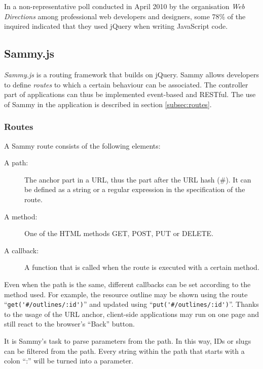 In a non-representative poll conducted in April 2010 by the organisation \textit{Web Directions} among professional web developers and designers, some 78\% of the inquired indicated that they used jQuery when writing JavaScript code. \cite{jquery:verbreitung}


\subsection{Sammy.js}
\label{subsec:sammy}

\textit{Sammy.js} \cite{sammy:homepage} is a routing framework that builds on jQuery. Sammy allows developers to define \textit{routes} to which a certain behaviour can be associated. The controller part of applications can thus be implemented event-based and RESTful. The use of Sammy in the application is described in section \ref{subsec:routes}.

\subsubsection{Routes}

A Sammy route consists of the following elements:

\begin{description}
  \item[A path:] The anchor part in a URL, thus the part after the URL hash ({\selectfont\#}). It can be defined as a string or a regular expression in the specification of the route.
  \item[A method:] One of the HTML methods {\selectfont GET}, {\selectfont POST}, {\selectfont PUT} or {\selectfont DELETE}.
  \item[A callback:] A function that is called when the route is executed with a certain method.
\end{description}

Even when the path is the same, different callbacks can be set according to the method used. For example, the resource outline may be shown using the route \enquote{\lstinline!get('#/outlines/:id')!} and updated using \enquote{\lstinline!put('#/outlines/:id')!}. Thanks to the usage of the URL anchor, client-side applications may run on one page and still react to the browser's \enquote{Back} button.

It is Sammy's task to parse parameters from the path. In this way, IDs or slugs can be filtered from the path. Every string within the path that starts with a colon \enquote{:} will be turned into a parameter.

